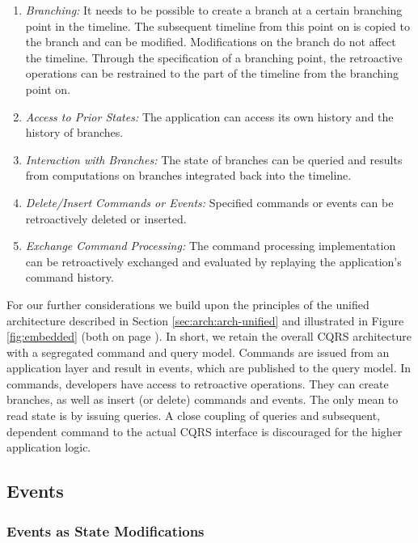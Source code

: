 \pagebreak

\begin{enumerate}
	\item \emph{Branching:}
	It needs to be possible to create a branch at a certain branching point 
	in the timeline. The subsequent timeline from this point on is copied to 
	the branch and can be modified.
	Modifications on the branch do not affect the timeline.
	Through the specification of a branching point, the retroactive operations 
	can be restrained to the part of the timeline from the branching point on.

	\item \emph{Access to Prior States:}
	The application can access its own history and the history of branches.

	\item \emph{Interaction with Branches:}
	The state of branches can be queried and results from computations on 
	branches integrated back into the timeline.

	\item \emph{Delete/Insert Commands or Events:}
	Specified commands or events can be retroactively deleted or inserted.

	\item \emph{Exchange Command Processing:}
	The command processing implementation can be retroactively exchanged
	and evaluated by replaying the application's command history.
\end{enumerate}

For our further considerations we build upon the principles of the unified 
architecture described in Section \ref{sec:arch:arch-unified} and illustrated 
in Figure \ref{fig:embedded} (both on page \pageref{fig:embedded}).
%
In short, we retain the overall CQRS architecture with a segregated command and 
query model. Commands are issued from an application layer and result in events, 
which are published to the query model. In commands, developers have access to 
retroactive operations. 
They can create branches, as well as insert (or delete) commands and events.
The only mean to read state is by issuing queries.
%
A close coupling of queries and subsequent, dependent command to the actual 
CQRS interface is discouraged for the higher application logic.


\subsection{Events}
\subsubsection{Events as State Modifications}
\label{sec:events-as-statem}

